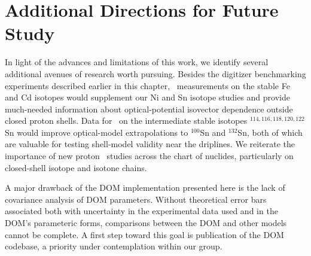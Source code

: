 \section{Additional Directions for Future Study}
In light of the advances and limitations of this work, we identify several
additional avenues of research worth pursuing.
Besides the digitizer benchmarking experiments described earlier
in this chapter, \tot\ measurements on the stable Fe and Cd isotopes would
supplement our Ni and Sn isotope studies and provide much-needed information
about optical-potential isovector dependence outside closed proton shells.
Data for \tot\ on the intermediate stable isotopes $^{114,116,118,120,122}$Sn
would improve optical-model extrapolations to $^{100}$Sn and $^{132}$Sn,
both of which are valuable for testing shell-model validity near the driplines.
We reiterate the importance of new proton \rxn\
studies across the chart of nuclides, particularly on closed-shell isotope and isotone
chains.

A major drawback of the DOM implementation presented here is
the lack of covariance analysis of DOM parameters. Without theoretical error
bars associated both with uncertainty in the experimental data used and in the
DOM's parameteric forms, comparisons between the DOM and other models cannot be
complete. A first step toward this goal is publication of the DOM codebase, a
priority under contemplation within our group.
